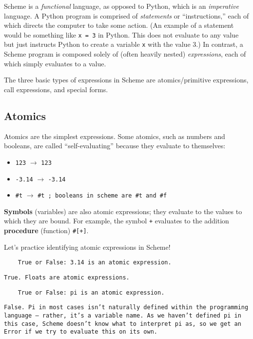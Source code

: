 Scheme is a \textit{functional} language, as opposed to Python, which is an \textit{imperative} language. A Python program is comprised of \textit{statements} or ``instructions,'' each of which directs the computer to take some action. (An example of a statement would be something like \lstinline{x = 3} in Python. This does not evaluate to any value but just instructs Python to create a variable \lstinline{x} with the value 3.) In contrast, a Scheme program is composed solely of (often heavily nested) \textit{expressions}, each of which simply evaluates to a value. 

The three basic types of expressions in Scheme are atomics/primitive expressions, call expressions, and special forms.  

\subsection{Atomics}

Atomics are the simplest expressions. Some atomics, such as numbers and booleans, are called ``self-evaluating'' because they evaluate to themselves: 
\begin{itemize}
    \item \lstinline{123} $\rightarrow$ \lstinline{123}
    \item \lstinline{-3.14} $\rightarrow$ \lstinline{-3.14}
    \item \lstinline{#t} $\rightarrow$ \lstinline{#t ; booleans in scheme are #t and #f}
\end{itemize}

\textbf{Symbols} (variables) are also atomic expressions; they evaluate to the values to which they are bound. For example, the symbol \lstinline{+} evaluates to the addition \textbf{procedure} (function) \lstinline{#[+]}. 

\question Let's practice identifying atomic expressions in Scheme!

\begin{lstlisting}
    True or False: 3.14 is an atomic expression.
\end{lstlisting}
\begin{solution}[0.25in]
\texttt{True. Floats are atomic expressions.}
\end{solution}

\begin{lstlisting}
    True or False: pi is an atomic expression.
\end{lstlisting}
\begin{solution}[0.25in]
    \texttt{False. Pi in most cases isn't naturally defined within the programming language -- rather, it's a variable name. As we haven't defined pi in this case, Scheme doesn't know what to interpret pi as, so we get an Error if we try to evaluate this on its own.}
\end{solution}

